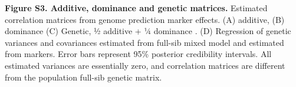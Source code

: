 \begin{refsection}
\textbf{Figure S3. Additive, dominance and genetic matrices.} Estimated
correlation matrices from genome prediction marker effects. (A)
additive, (B) dominance (C) Genetic, ½ additive + ¼ dominance . (D)
Regression of genetic variances and covariances estimated from full-sib
mixed model and estimated from markers. Error bars represent 95\%
posterior credibility intervals. All estimated variances are essentially
zero, and correlation matrices are different from the population
full-sib genetic matrix.

\end{refsection}
